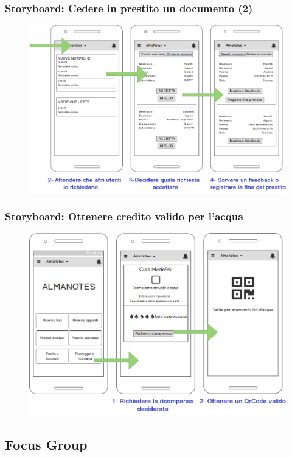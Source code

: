 \documentclass{beamer}
\begin{document}
\begin{frame}
\frametitle{Storyboard: Cedere in prestito un documento (2)}
\begin{figure}
\includegraphics[width=0.95\linewidth]{images/storyboard4.png}
\end{figure}
\end{frame}
\begin{frame}
\frametitle{Storyboard: Ottenere credito valido per l'acqua}
\begin{figure}
\includegraphics[width=0.90\linewidth]{images/storyboard5.png}
\end{figure}
\end{frame}
\subsection{Focus Group}
\end{document}
